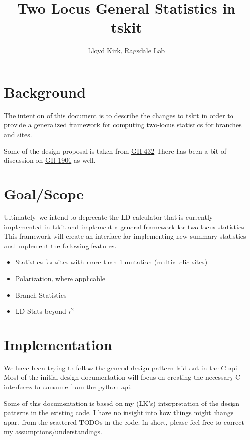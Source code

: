 \documentclass[12pt]{article}
\title{Two Locus General Statistics in tskit}
\author{Lloyd Kirk, Ragsdale Lab}
\begin{document}
\maketitle

\section{Background}

The intention of this document is to describe the changes to tskit in order to
provide a generalized framework for computing two-locus statistics for branches
and sites.

Some of the design proposal is taken from
\href{https://github.com/tskit-dev/tskit/pull/432}{GH-432} There has been a bit
of discussion on \href{https://github.com/tskit-dev/tskit/issues/1900}{GH-1900}
as well.

\section{Goal/Scope}

Ultimately, we intend to deprecate the LD calculator that is currently
implemented in tskit and implement a general framework for two-locus
statistics. This framework will create an interface for implementing new summary
statistics and implement the following features:

\begin{itemize}
  \item Statistics for sites with more than 1 mutation (multiallelic sites)
  \item Polarization, where applicable
  \item Branch Statistics
  \item LD Stats beyond $r^{2}$
\end{itemize}

\section{Implementation}
We have been trying to follow the general design pattern laid out in the C
api. Most of the initial design documentation will focus on creating the
necessary C interfaces to consume from the python api.

Some of this documentation is based on my (LK’s) interpretation of the design
patterns in the existing code. I have no insight into how things might change
apart from the scattered TODOs in the code. In short, please feel free to
correct my assumptions/understandings.
\end{document}

